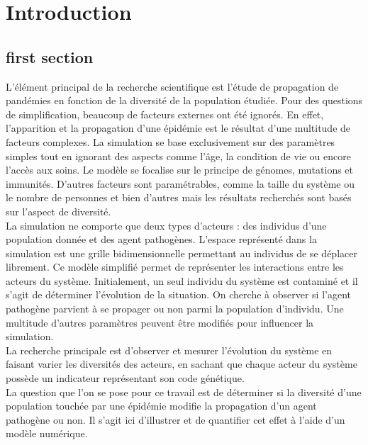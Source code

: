 \chapter{Introduction} \label{ch:intro}



\section{first section}
L'élément principal de la recherche scientifique est l'étude de propagation de pandémies en fonction de la diversité de la population étudiée. Pour des questions de simplification, beaucoup de facteurs externes ont été ignorés. En effet, l'apparition et la propagation d'une épidémie est le résultat d'une multitude de facteurs complexes. La simulation se base exclusivement sur des paramètres simples tout en ignorant des aspects comme l'âge, la condition de vie ou encore l'accès aux soins. Le modèle se focalise sur le principe de génomes, mutations et immunités. D'autres facteurs sont paramétrables, comme la taille du système ou le nombre de personnes et bien d'autres mais les résultats recherchés sont basés sur l'aspect de diversité.\\

La simulation ne comporte que deux types d'acteurs : des individus d'une population donnée et des agent pathogènes. L'espace représenté dans la simulation est une grille bidimensionnelle permettant au individus de se déplacer librement. Ce modèle simplifié permet de représenter les interactions entre les acteurs du système. Initialement, un seul individu du système est contaminé et il s'agit de déterminer l'évolution de la situation. On cherche à observer si l'agent pathogène parvient à se propager ou non parmi la population d'individu. Une multitude d'autres paramètres peuvent être modifiés pour influencer la simulation.\\

La recherche principale est d'observer et mesurer l'évolution du système en faisant varier les diversités des acteurs, en sachant que chaque acteur du système possède un indicateur représentant son code génétique.\\

La question que l'on se pose pour ce travail est de déterminer si la diversité d'une population touchée par une épidémie modifie la propagation d'un agent pathogène ou non. Il s'agit ici d'illustrer et de quantifier cet effet à l'aide d'un modèle numérique.